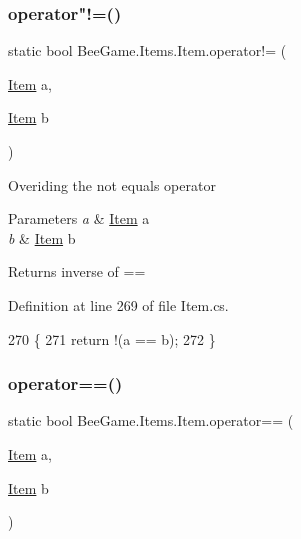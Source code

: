 \subsubsection{\texorpdfstring{operator"!=()}{operator!=()}}
{\footnotesize\ttfamily static bool Bee\+Game.\+Items.\+Item.\+operator!= (\begin{DoxyParamCaption}\item[{\hyperlink{struct_bee_game_1_1_items_1_1_item}{Item}}]{a,  }\item[{\hyperlink{struct_bee_game_1_1_items_1_1_item}{Item}}]{b }\end{DoxyParamCaption})\hspace{0.3cm}{\ttfamily [static]}}



Overiding the not equals operator 


\begin{DoxyParams}{Parameters}
{\em a} & \hyperlink{struct_bee_game_1_1_items_1_1_item}{Item} a\\
\hline
{\em b} & \hyperlink{struct_bee_game_1_1_items_1_1_item}{Item} b\\
\hline
\end{DoxyParams}
\begin{DoxyReturn}{Returns}
inverse of ==
\end{DoxyReturn}


Definition at line 269 of file Item.\+cs.


\begin{DoxyCode}
270         \{
271             \textcolor{keywordflow}{return} !(a == b);
272         \}
\end{DoxyCode}
\mbox{\label{struct_bee_game_1_1_items_1_1_item_a33e02e23b17caf1ab0f6ff9c6ee3dd89}} 
\subsubsection{\texorpdfstring{operator==()}{operator==()}}
{\footnotesize\ttfamily static bool Bee\+Game.\+Items.\+Item.\+operator== (\begin{DoxyParamCaption}\item[{\hyperlink{struct_bee_game_1_1_items_1_1_item}{Item}}]{a,  }\item[{\hyperlink{struct_bee_game_1_1_items_1_1_item}{Item}}]{b }\end{DoxyParamCaption})\hspace{0.3cm}{\ttfamily [static]}}



